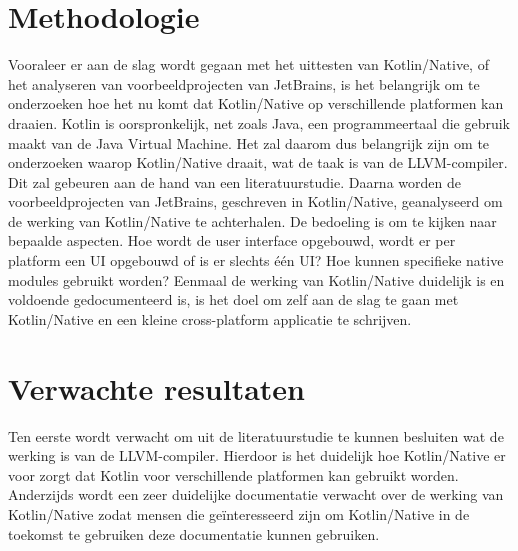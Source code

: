 	\section{Methodologie}
	\label{sec:methodologie}
	Vooraleer er aan de slag wordt gegaan met het uittesten van Kotlin/Native, of het analyseren van voorbeeldprojecten van JetBrains, is het belangrijk om te onderzoeken hoe het nu komt dat Kotlin/Native op verschillende platformen kan draaien. Kotlin is oorspronkelijk, net zoals Java, een programmeertaal die gebruik maakt van de Java Virtual Machine. Het zal daarom dus belangrijk zijn om te onderzoeken waarop Kotlin/Native draait, wat de taak is van de LLVM-compiler. Dit zal gebeuren aan de hand van een literatuurstudie.
	\newline
	\newline
	Daarna worden de voorbeeldprojecten van JetBrains, geschreven in Kotlin/Native, geanalyseerd om de werking van Kotlin/Native te achterhalen. De bedoeling is om te kijken naar bepaalde aspecten. Hoe wordt de user interface opgebouwd, wordt er per platform een UI opgebouwd of is er slechts één UI? Hoe kunnen specifieke native modules gebruikt worden? 
	\newline
	\newline
	Eenmaal de werking van Kotlin/Native duidelijk is en voldoende gedocumenteerd is, is het doel om zelf aan de slag te gaan met Kotlin/Native en een kleine cross-platform applicatie te schrijven.
	
	\section{Verwachte resultaten}
	\label{sec:verwachte_resultaten}
	Ten eerste wordt verwacht om uit de literatuurstudie te kunnen besluiten wat de werking is van de LLVM-compiler. Hierdoor is het duidelijk hoe Kotlin/Native er voor zorgt dat Kotlin voor verschillende platformen kan gebruikt worden.
	\newline
	\newline
	Anderzijds wordt een zeer duidelijke documentatie verwacht over de werking van Kotlin/Native zodat mensen die geïnteresseerd zijn om Kotlin/Native in de toekomst te gebruiken deze documentatie kunnen gebruiken. 
	
